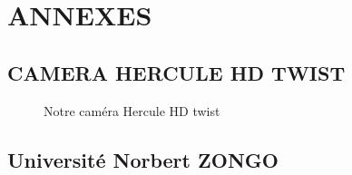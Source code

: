 \chapter*{ANNEXES}
\adjustmtc
\thispagestyle{MyStyle}

\makeatletter\renewcommand{}\makeatother


\appendix
\renewcommand{\thefigure}{A.\arabic{figure}}
\setcounter{figure}{0}
\section{CAMERA HERCULE HD TWIST}
 
\begin{figure}[H]%
    \center%
    \setlength{\fboxsep}{5pt}%
    \setlength{\fboxrule}{0.5pt}%
    \caption{Notre caméra Hercule HD twist}%
\end{figure}

\section{Université Norbert ZONGO}
 
